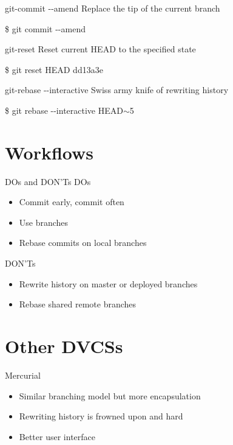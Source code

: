 \documentclass{beamer}
\begin{document}
\begin{frame}{git-commit -{}-amend}
  Replace the tip of the current branch
  \begin{Example}
    \$ git commit -{}-amend
  \end{Example}
\end{frame}

\begin{frame}{git-reset}
  Reset current HEAD to the specified state
  \begin{Example}
    \$ git reset HEAD dd13a3e
  \end{Example}
\end{frame}

\begin{frame}{git-rebase -{}-interactive}
  Swiss army knife of rewriting history
  \begin{Example}
    \$ git rebase -{}-interactive HEAD$\sim$5
  \end{Example}
\end{frame}

\section{Workflows}

\begin{frame}{DOs and DON'Ts}
  DOs
  \begin{itemize}
  \item Commit early, commit often
  \item Use branches
  \item Rebase commits on local branches
  \end{itemize}
  DON'Ts
  \begin{itemize}
  \item Rewrite history on master or deployed branches
  \item Rebase shared remote branches
  \end{itemize}
\end{frame}

\section{Other DVCSs}

\begin{frame}{Mercurial}
  \begin{itemize}
  \item Similar branching model but more encapsulation
  \item Rewriting history is frowned upon and hard
  \item Better user interface
  \end{itemize}
\end{frame}
\end{document}
